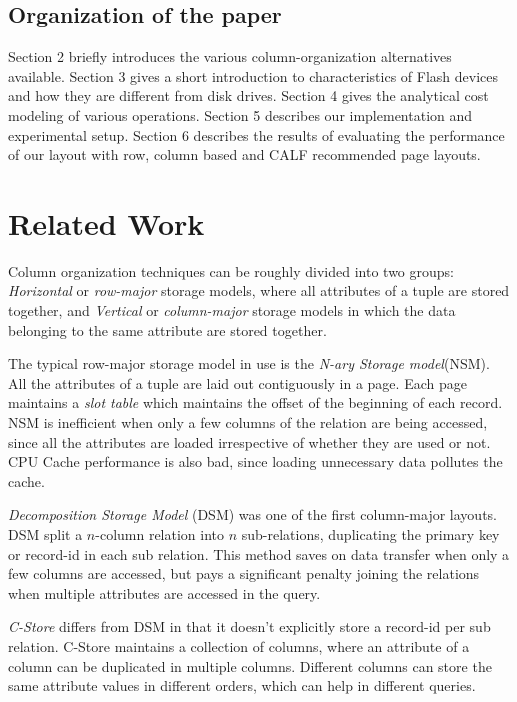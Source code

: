 \documentclass[twocolumn,11pt]{article}
\begin{document}
\subsection{Organization of the paper}

Section 2 briefly introduces the various column-organization alternatives available.
Section 3 gives a short introduction to characteristics of Flash devices and how
they are different from disk drives. Section 4 gives the analytical cost modeling
of various operations. Section 5 describes our implementation and experimental setup.
Section 6 describes the results of evaluating the performance of our layout with
row, column based and CALF recommended page layouts.

\section{Related Work}

Column organization techniques can be roughly divided into two groups:
{\em Horizontal} or {\em row-major} storage models, where all attributes of a tuple
are stored together, and {\em Vertical} or {\em column-major} storage models
in which the data belonging to the same attribute are stored together.

The typical row-major storage model in use is the {\em N-ary Storage model}(NSM).
All the attributes of a tuple are laid out contiguously in a page. Each page
maintains a {\em slot table} which maintains the offset of the beginning of
each record. NSM is inefficient when only a few columns of the relation are
being accessed, since all the attributes are loaded irrespective of whether they
are used or not. CPU Cache performance is also bad, since loading unnecessary data
pollutes the cache.

{\em Decomposition Storage Model} (DSM) \cite{CK 85} was one of the first column-major
layouts. DSM split a $n$-column relation into $n$ sub-relations, duplicating
the primary key or record-id in each sub relation. This method saves on data
transfer when only a few columns are accessed, but pays a significant penalty
joining the relations when multiple attributes are accessed in the query.

{\em C-Store} \cite{SAB05} differs from DSM in that it doesn't explicitly store a
record-id per sub relation. C-Store maintains a collection of columns, where
an attribute of a column can be duplicated in multiple columns. Different columns
can store the same attribute values in different orders, which can help in
different queries.
\end{document}
